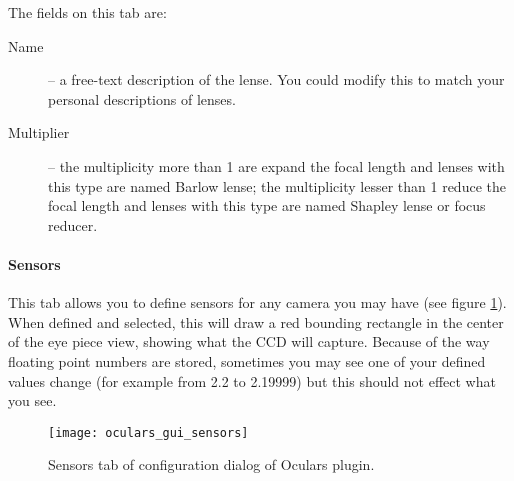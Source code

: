 The fields on this tab are:
\begin{description}
\item[Name] -- a free-text description of the lense. You could modify this to match your personal descriptions of lenses.
\item[Multiplier] -- the multiplicity more than 1 are expand the focal length and lenses with this type are named Barlow lense; the multiplicity lesser than 1 reduce the focal length and lenses with this type are named Shapley lense or focus reducer.
\end{description}

\paragraph{Sensors}

This tab allows you to define sensors for any camera you may have (see figure \ref{fig:plugins:Oculars:Gui:Sensors}). When defined and selected, this will draw a red bounding rectangle in the center of the eye piece view, showing what the CCD will capture. Because of the way floating point numbers are stored, sometimes you may see one of your defined values change (for example from 2.2 to 2.19999) but this should not effect what you see.

\begin{figure}[ht]\centering
\texttt{[image: oculars\_gui\_sensors]}
\caption{Sensors tab of configuration dialog of Oculars plugin.}
\label{fig:plugins:Oculars:Gui:Sensors}
\end{figure}

